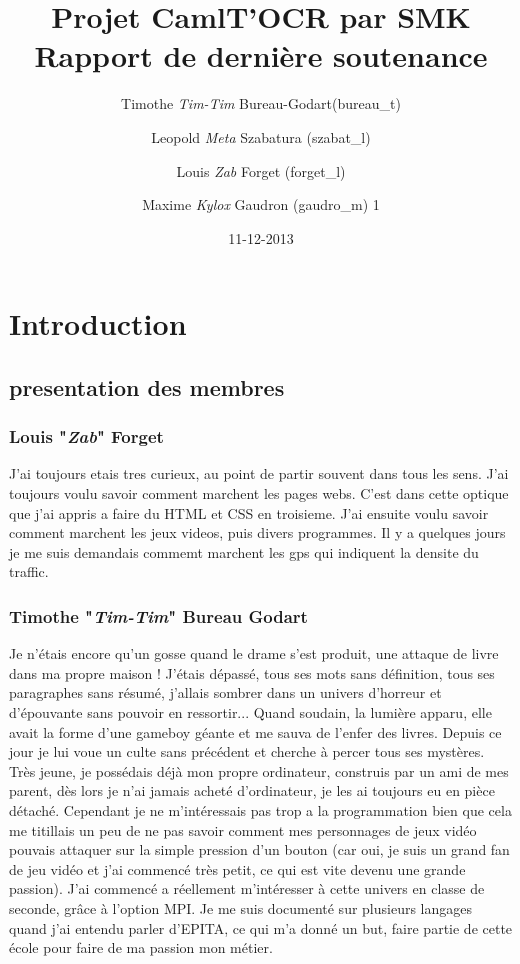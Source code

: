 \documentclass[12pt]{article}
\title{Projet CamlT'OCR par SMK \\ Rapport de dernière soutenance}
\date{11-12-2013}
\author{
  Timothe \textit{Tim-Tim} Bureau-Godart(bureau\_t) \and
  Leopold \textit{Meta} Szabatura (szabat\_l) \and
  Louis \textit{Zab} Forget (forget\_l) \and
  Maxime \textit{Kylox} Gaudron (gaudro\_m)
1      }
\begin{document}
\maketitle
\newpage
\tableofcontents
\newpage
\section{Introduction}
\subsection{presentation des membres}
\subsubsection{Louis "\textit{Zab}" Forget}
J'ai toujours etais tres curieux, au point de partir souvent dans tous les sens. J'ai toujours voulu savoir comment marchent les pages webs. C'est dans cette optique que j'ai appris a faire du HTML et CSS en troisieme. J'ai ensuite voulu savoir comment marchent les jeux videos, puis divers programmes. Il y a quelques jours je me suis demandais commemt marchent les gps qui indiquent la densite du traffic.
\subsubsection{Timothe "\textit{Tim-Tim}" Bureau Godart}
Je n'étais encore qu'un gosse quand le drame s'est produit, une attaque de livre dans ma propre maison ! J'étais dépassé, tous ses mots sans définition, tous ses paragraphes sans résumé, j'allais sombrer dans un univers d'horreur et d'épouvante sans pouvoir en ressortir... Quand soudain, la lumière apparu, elle avait la forme d'une gameboy géante et me sauva de l'enfer des livres. Depuis ce jour je lui voue un culte sans précédent et cherche à percer tous ses mystères.
Très jeune, je possédais déjà mon propre ordinateur, construis par un ami de mes parent, dès lors je n'ai jamais acheté d'ordinateur, je les ai toujours eu en pièce détaché. Cependant je ne m'intéressais pas trop a la programmation bien que cela me titillais un peu de ne pas savoir comment mes personnages de jeux vidéo pouvais attaquer sur la simple pression d'un bouton (car oui, je suis un grand fan de jeu vidéo et j'ai commencé très petit, ce qui est vite devenu une grande passion). J'ai commencé a réellement m'intéresser à cette univers en classe de seconde, grâce à l'option MPI. Je me suis documenté sur plusieurs langages quand j'ai entendu parler d'EPITA, ce qui m'a donné un but, faire partie de cette école pour faire de ma passion mon métier.
\end{document}
